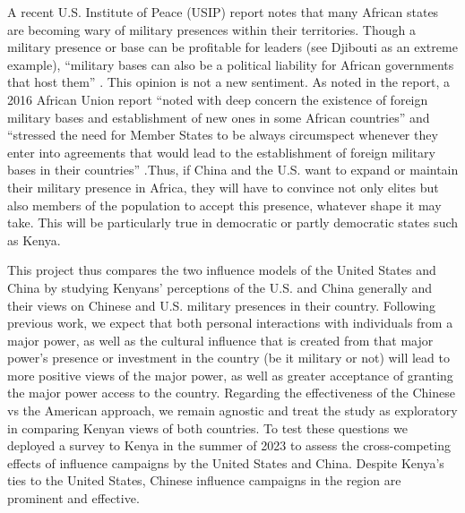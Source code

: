 

A recent U.S. Institute of Peace (USIP) report notes that many African states are becoming wary of military presences within their territories. Though a military presence or base can be profitable for leaders (see Djibouti as an extreme example), ``military bases can also be a political liability for African governments that host them'' \cite{usip2024}. This opinion is not a new sentiment. As noted in the report, a 2016 African Union report ``noted with deep concern the existence of foreign military bases and establishment of new ones in some African countries'' and ``stressed the need for Member States to be always circumspect whenever they enter into agreements that would lead to the establishment of foreign military bases in their countries'' \cite{AU2016}.Thus, if China and the U.S. want to expand or maintain their military presence in Africa, they will have to convince not only elites but also members of the population to accept this presence, whatever shape it may take. This will be particularly true in democratic or partly democratic states such as Kenya. 

This project thus compares the two influence models of the United States and China by studying Kenyans' perceptions of the U.S. and China generally and their views on Chinese and U.S. military presences in their country. Following previous work, we expect that both personal interactions with individuals from a major power, as well as the cultural influence that is created from that major power's presence or investment in the country (be it military or not) will lead to more positive views of the major power, as well as greater acceptance of granting the major power access to the country. Regarding the effectiveness of the Chinese vs the American approach, we remain agnostic and treat the study as exploratory in comparing Kenyan views of both countries. To test these questions we deployed a survey to Kenya in the summer of 2023 to assess the cross-competing effects of influence campaigns by the United States and China. Despite Kenya's ties to the United States, Chinese influence campaigns in the region are prominent and effective. 






